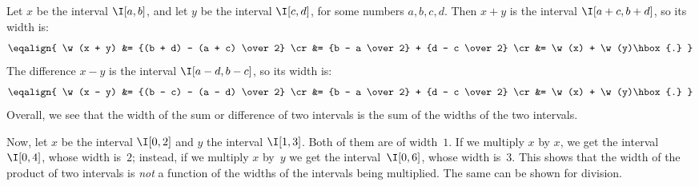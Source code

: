 Let $x$ be the interval $\I[a,b]$, and let $y$ be the interval $\I[c,d]$, for some numbers $a, b, c, d$.  Then $x+y$ is the interval $\I[a+c, b+d]$, so its width is:
$$
\def\w{\mathop{\rm width}}
\eqalign{
\w(x + y) &= {(b + d) - (a + c) \over 2} \cr
          &= {b - a \over 2} + {d - c \over 2} \cr
          &= \w(x) + \w(y)\hbox{.}
}
$$
The difference $x-y$ is the interval $\I[a - d, b - c]$, so its width is:
$$
\def\w{\mathop{\rm width}}
\eqalign{
\w(x - y) &= {(b - c) - (a - d) \over 2} \cr
          &= {b - a \over 2} + {d - c \over 2} \cr
          &= \w(x) + \w(y)\hbox{.}
}
$$
Overall, we see that the width of the sum or difference of two intervals is the sum of the widths of the two intervals. 

Now, let $x$ be the interval $\I[0,2]$ and $y$ the interval $\I[1,3]$.  Both of them are of width~$1$.  If we multiply $x$ by $x$, we get the interval~$\I[0,4]$, whose width is~$2$;  instead, if we multiply $x$ by~$y$ we get the interval~$\I[0,6]$, whose width is~$3$.  This shows that the width of the product of two intervals is {\em not} a function of the widths of the intervals being multiplied.  The same can be shown for division.

